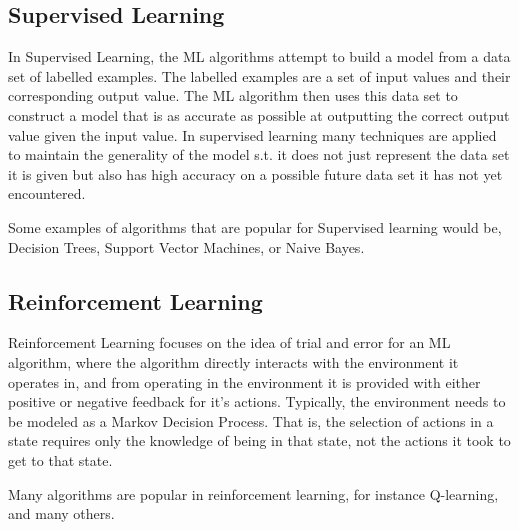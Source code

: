 

\subsection{Supervised Learning}

In Supervised Learning, the ML algorithms attempt to build a model from a data set of labelled examples. The labelled examples are a set of input values and their corresponding output value. The ML algorithm then uses this data set to construct a model that is as accurate as possible at outputting the correct output value given the input value. In supervised learning many techniques are applied to maintain the generality of the model s.t. it does not just represent the data set it is given but also has high accuracy on a possible future data set it has not yet encountered.

Some examples of algorithms that are popular for Supervised learning would be, Decision Trees, Support Vector Machines, or Naive Bayes.

\subsection{Reinforcement Learning}

Reinforcement Learning focuses on the idea of trial and error for an ML algorithm, where the algorithm directly interacts with the environment it operates in, and from operating in the environment it is provided with either positive or negative feedback for it's actions. Typically, the environment needs to be modeled as a Markov Decision Process. That is, the selection of actions in a state requires only the knowledge of being in that state, not the actions it took to get to that state.

Many algorithms are popular in reinforcement learning, for instance Q-learning\cite{qlearning:watkins}, and many others.

